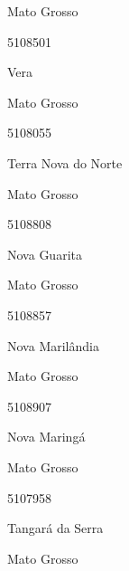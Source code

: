 \documentclass[
  letterpaper,
]{report}
\begin{document}
\n    

\n    

\n      

Mato Grosso

\n      

5108501

\n      

Vera

\n    

\n    

\n      

Mato Grosso

\n      

5108055

\n      

Terra Nova do Norte

\n    

\n    

\n      

Mato Grosso

\n      

5108808

\n      

Nova Guarita

\n    

\n    

\n      

Mato Grosso

\n      

5108857

\n      

Nova Marilândia

\n    

\n    

\n      

Mato Grosso

\n      

5108907

\n      

Nova Maringá

\n    

\n    

\n      

Mato Grosso

\n      

5107958

\n      

Tangará da Serra

\n    

\n    

\n      

Mato Grosso
\end{document}

